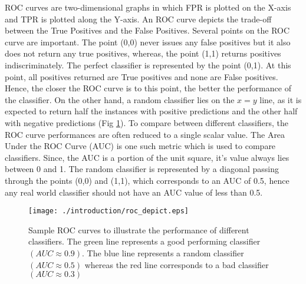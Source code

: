 ROC curves are two-dimensional graphs in which FPR is plotted on the X-axis and TPR is plotted along the Y-axis. An ROC curve depicts the trade-off between the True Positives and the False Positives. Several points on the ROC curve are important. The point (0,0) never issues any false positives but it also does not return any true positives, whereas, the point (1,1) returns positives indiscriminately. The perfect classifier is represented by the point (0,1). At this point, all positives returned are True positives and none are False positives. Hence, the closer the ROC curve is to this point, the better the performance of the classifier. On the other hand, a random classifier lies on the $x = y$ line, as it is expected to return half the instances with positive predictions and the other half with negative predictions (Fig \ref{roc_ill}).
	To compare between different classifiers, the ROC curve performances are often reduced to a single scalar value. The Area Under the ROC Curve (AUC) is one such metric which is used to compare classifiers. Since, the AUC is a portion of the unit square, it's value always lies between 0 and 1. The random classifier is represented by a diagonal passing through the points (0,0) and (1,1), which corresponds to an AUC of 0.5, hence any real world classifier should not have an AUC value of less than 0.5.
\begin{figure}[h]
	\centering
	\texttt{[image: ./introduction/roc\_depict.eps]}
	\caption[Demonstrative ROC curves]{Sample ROC curves to illustrate the performance of different classifiers. The green line represents a good performing classifier $(AUC \approx 0.9)$. The blue line represents a random classifier $(AUC \approx 0.5)$ whereas the red line corresponds to a bad classifier $(AUC \approx 0.3)$  }
	\label{roc_ill}
\end{figure}

